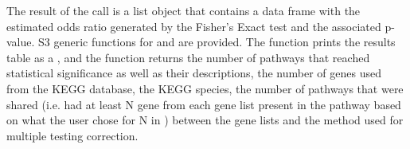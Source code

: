 \documentclass[article]{jss}\usepackage[]{graphicx}\usepackage[]{color}
\begin{document}
The result of the  call is a list object that
contains a data frame with the estimated odds ratio generated
by the Fisher's Exact test and the associated p-value. S3 generic
functions for  and  are provided. The
 function prints the results table as a ,
and the  function returns the number of pathways
that reached statistical significance as well as their descriptions,
the number of genes used from the KEGG database, the KEGG species,
the number of pathways that were shared (i.e. had at least N gene
from each gene list present in the pathway based on what the user
chose for N in ) between the gene lists and the
method used for multiple testing correction.



\end{document}
